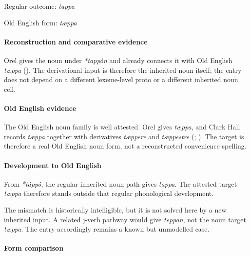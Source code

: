 \documentclass[
  british,
  a4paper,
]{article}
\begin{document}
Regular outcome: \emph{tappa}

Old English form: \emph{tæppa}

\paragraph{Reconstruction and comparative
evidence}\label{reconstruction-and-comparative-evidence-71}

Orel gives the noun under \emph{*tappòn} and already connects it with
Old English \emph{tæppa} (). The
derivational input is therefore the inherited noun itself; the entry
does not depend on a different lexeme-level proto or a different
inherited noun cell.

\paragraph{Old English evidence}\label{old-english-evidence-71}

The Old English noun family is well attested. Orel gives \emph{tæppa},
and Clark Hall records \emph{tæppa} together with derivatives
\emph{tæppere} and \emph{tæppestre} (; ). The target is
therefore a real Old English noun form, not a reconstructed convenience
spelling.

\paragraph{Development to Old
English}\label{development-to-old-english-71}

From \emph{*táppô}, the regular inherited noun path gives \emph{tappa}.
The attested target \emph{tæppa} therefore stands outside that regular
phonological development.

The mismatch is historically intelligible, but it is not solved here by
a new inherited input. A related j-verb pathway would give
\emph{teppan}, not the noun target \emph{tæppa}. The entry accordingly
remains a known but unmodelled case.

\paragraph{Form comparison}\label{form-comparison-2}
\end{document}
